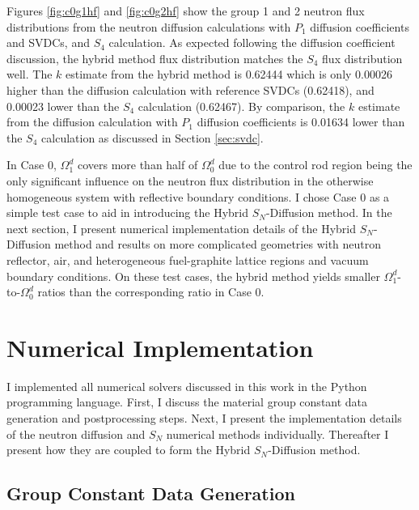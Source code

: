 Figures \ref{fig:c0g1hf} and \ref{fig:c0g2hf} show the group 1 and 2 neutron flux distributions
from the neutron diffusion calculations with $P_1$ diffusion coefficients and \glspl{SVDC}, and
$S_4$ calculation. As expected following the diffusion coefficient discussion, the hybrid method
flux distribution matches the $S_4$ flux distribution well. The $k$ estimate from the hybrid
method is 0.62444 which is only 0.00026 higher than the diffusion calculation with reference
\glspl{SVDC} (0.62418), and 0.00023 lower than the $S_4$ calculation (0.62467). By comparison, the
$k$ estimate from the diffusion calculation with $P_1$ diffusion coefficients is 0.01634 lower than
the $S_4$ calculation as discussed in Section \ref{sec:svdc}.

In Case 0, $\Omega^d_1$ covers more than half of $\Omega^d_0$ due to
the control rod region being the only significant influence on the neutron flux distribution in the
otherwise homogeneous system with reflective boundary conditions. I chose Case 0 as a simple test
case to aid in introducing the Hybrid $S_N$-Diffusion method. In the next section, I
present numerical implementation details of the Hybrid $S_N$-Diffusion method and results on more
complicated geometries with neutron reflector, air, and heterogeneous fuel-graphite lattice
regions and vacuum boundary conditions. On these test cases, the hybrid method yields
smaller $\Omega^d_1$-to-$\Omega^d_0$ ratios than the corresponding ratio in Case 0.

\section{Numerical Implementation} \label{sec:implementation}

I implemented all numerical solvers discussed in this work in the Python programming language.
First, I discuss the material group constant data generation and postprocessing steps. Next, I
present the implementation details of the neutron diffusion and $S_N$ numerical methods
individually. Thereafter I present how they are coupled to form the Hybrid $S_N$-Diffusion method.

\subsection{Group Constant Data Generation}

